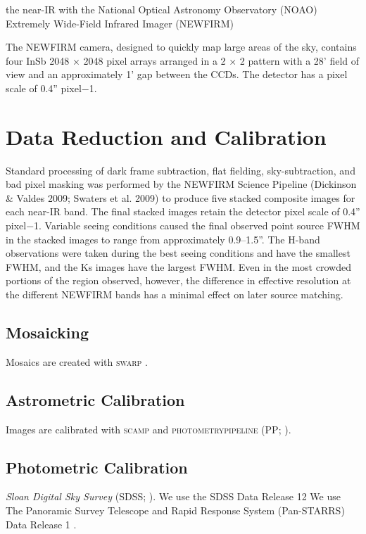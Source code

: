\documentclass[fleqn,usenatbib]{mnras}
\begin{document}
the near-IR with the National Optical Astronomy
Observatory (NOAO) Extremely Wide-Field Infrared Imager
(NEWFIRM)

The
NEWFIRM camera, designed to quickly map large areas of the
sky, contains four InSb 2048 × 2048 pixel arrays arranged in a
2 × 2 pattern with a 28' field of view and an approximately
1' gap between the CCDs. The detector has a pixel scale of
0.4'' pixel−1. \citep{Probst2004}

\section{Data Reduction and Calibration}\label{sec:data reduction}
Standard processing of dark frame subtraction, flat fielding,
sky-subtraction, and bad pixel masking was performed by
the NEWFIRM Science Pipeline (Dickinson \& Valdes 2009;
Swaters et al. 2009) to produce five stacked composite images
for each near-IR band. The final stacked images retain the
detector pixel scale of 0.4'' pixel−1. Variable seeing conditions
caused the final observed point source FWHM in the stacked
images to range from approximately 0.9–1.5''. The H-band
observations were taken during the best seeing conditions and
have the smallest FWHM, and the Ks images have the largest
FWHM. Even in the most crowded portions of the region
observed, however, the difference in effective resolution at the
different NEWFIRM bands has a minimal effect on later source matching.

\subsection{Mosaicking}
Mosaics are created with \textsc{swarp} \citep{Bertin2002}.

\subsection{Astrometric Calibration}
Images are calibrated with \textsc{scamp} \citep{Bertin2006} and \textsc{photometrypipeline} (PP; \citealt{Mommert2017}).

\subsection{Photometric Calibration}
\textit{Sloan Digital Sky Survey} (SDSS; \citealt{York2000}).
We use the SDSS Data Release 12 \citep{Alam2015}
We use The Panoramic Survey Telescope and Rapid Response System (Pan-STARRS) Data Release 1 \citep{Chambers2016, Flewelling2016}.
\end{document}
